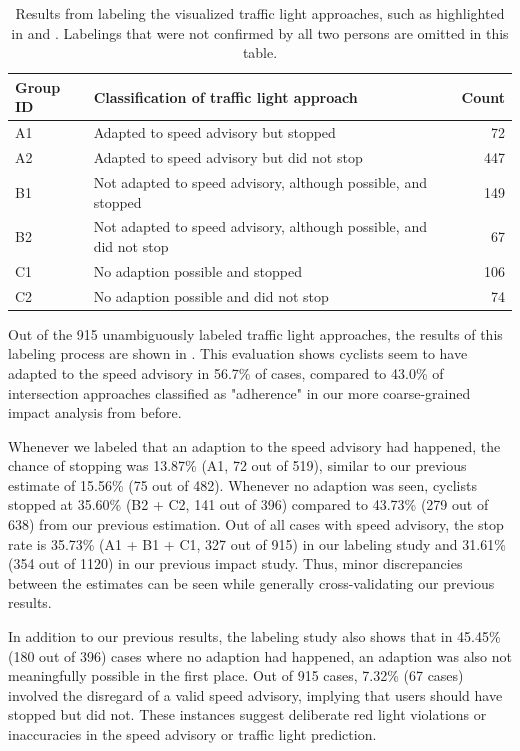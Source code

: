 \begin{table}[t]
\centering
\begin{tabular}{@{}llr@{}}
\toprule
\textbf{Group ID} & \textbf{Classification of traffic light approach} & \textbf{Count} \\
\midrule
A1 & Adapted to speed advisory but stopped & 72 \\
A2 & Adapted to speed advisory but did not stop & 447 \\
B1 & Not adapted to speed advisory, although possible, and stopped & 149 \\
B2 & Not adapted to speed advisory, although possible, and did not stop & 67 \\
C1 & No adaption possible and stopped & 106 \\
C2 & No adaption possible and did not stop & 74 \\
\bottomrule
\end{tabular}
\caption{Results from labeling the visualized traffic light approaches, such as highlighted in  and . Labelings that were not confirmed by all two persons are omitted in this table.}
\label{tab:impacts-labeling-results}
\end{table}

Out of the 915 unambiguously labeled traffic light approaches, the results of this labeling process are shown in . This evaluation shows cyclists seem to have adapted to the speed advisory in 56.7\% of cases, compared to 43.0\% of intersection approaches classified as "adherence" in our more coarse-grained impact analysis from before. 

Whenever we labeled that an adaption to the speed advisory had happened, the chance of stopping was 13.87\% (A1, 72 out of 519), similar to our previous estimate of 15.56\% (75 out of 482). Whenever no adaption was seen, cyclists stopped at 35.60\% (B2 + C2, 141 out of 396) compared to 43.73\% (279 out of 638) from our previous estimation. Out of all cases with speed advisory, the stop rate is 35.73\% (A1 + B1 + C1, 327 out of 915) in our labeling study and 31.61\% (354 out of 1120) in our previous impact study. Thus, minor discrepancies between the estimates can be seen while generally cross-validating our previous results. 

In addition to our previous results, the labeling study also shows that in 45.45\% (180 out of 396) cases where no adaption had happened, an adaption was also not meaningfully possible in the first place. Out of 915 cases, 7.32\% (67 cases) involved the disregard of a valid speed advisory, implying that users should have stopped but did not. These instances suggest deliberate red light violations or inaccuracies in the speed advisory or traffic light prediction.

